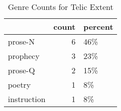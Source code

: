 \begin{table}[htbp!]
\centering
\caption{Genre Counts for Telic Extent}
\label{table:telext_gen_cp}
\begin{tabular}{lrl}
\toprule
{} &  count & percent \\
\midrule
prose-N     &      6 &     46\% \\
prophecy    &      3 &     23\% \\
prose-Q     &      2 &     15\% \\
poetry      &      1 &      8\% \\
instruction &      1 &      8\% \\
\bottomrule
\end{tabular}
\end{table}

